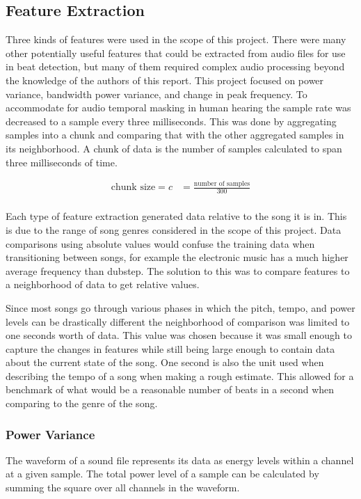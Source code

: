 \documentclass[12pt]{article}
\begin{document}
\subsection{Feature Extraction}
Three kinds of features were used in the scope of this project. There were many other potentially useful features that could be extracted from audio files for use in beat detection, but many of them required complex audio processing beyond the knowledge of the authors of this report. This project focused on power variance, bandwidth power variance, and change in peak frequency. To accommodate for audio temporal masking in human hearing the sample rate was decreased to a sample every three milliseconds. This was done by aggregating samples into a chunk and comparing that with the other aggregated samples in its neighborhood. A chunk of data is the number of samples calculated to span three milliseconds of time.

\begin{align*}
	\text{chunk size} = c &= \frac{\text{number of samples}}{300}\\
\end{align*}

Each type of feature extraction generated data relative to the song it is in. This is due to the range of song genres considered in the scope of this project. Data comparisons using absolute values would confuse the training data when transitioning between songs, for example the electronic music has a much higher average frequency than dubstep. The solution to this was to compare features to a neighborhood of data to get relative values.

Since most songs go through various phases in which the pitch, tempo, and power levels can be drastically different the neighborhood of comparison was limited to one seconds worth of data. This value was chosen because it was small enough to capture the changes in features while still being large enough to contain data about the current state of the song. One second is also the unit used when describing the tempo of a song when making a rough estimate. This allowed for a benchmark of what would be a reasonable number of beats in a second when comparing to the genre of the song.

\subsubsection{Power Variance}
The waveform of a sound file represents its data as energy levels within a channel at a given sample. The total power level of a sample can be calculated by summing the square over all channels in the waveform.
\end{document}
